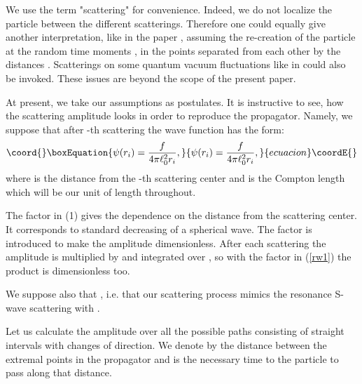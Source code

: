 \documentclass[a4paper,12pt]{article}
\begin{document}
We use the term "scattering" for convenience. Indeed, we do not localize the
particle between the different scatterings. Therefore one could equally give
another interpretation, like in the paper \cite{Kirilyuk00}, assuming the
re-creation of the  particle at the random time moments \coordHE{}, in  the points
separated from each other by the distances \coordHE{}. Scatterings on
some quantum
vacuum fluctuations like in \cite{Nelson84} could also be invoked.
These issues are beyond  the scope of the present paper.


At present, we take our assumptions as postulates. It is instructive
to see, how the scattering
amplitude looks  in order to reproduce the propagator. Namely, we suppose
that after \coordHE{}-th scattering the wave function has the form:
\begin{equation}\coord{}\boxEquation{\label{rw1}
\psi(r_i)=\frac{f}{4\pi \ell_0^2 r_{i}},
}{\psi(r_i)=\frac{f}{4\pi \ell_0^2 r_{i}},
}{ecuacion}\coordE{}\end{equation}
where \coordHE{} is the distance from the \coordHE{}-th scattering center
and \coordHE{} is the Compton length which will be our unit of length
throughout.

The factor \coordHE{} in (1) gives the dependence on the
distance from the scattering center. It corresponds to standard
decreasing of a spherical wave. The factor \coordHE{} is
introduced to make the amplitude \coordHE{} dimensionless.
After each scattering the amplitude is  multiplied by \coordHE{}
and integrated over \coordHE{}, so with the factor \coordHE{} in
(\ref{rw1}) the product \coordHE{} is dimensionless too.

We suppose also that \coordHE{}, i.e. that our scattering process
mimics the resonance S-wave scattering with \coordHE{}.

Let us calculate  the amplitude \coordHE{} over all the possible
paths consisting of straight intervals with \coordHE{} changes of
direction. We denote by \coordHE{} the distance between the
extremal points in the propagator and \coordHE{} is the necessary time to
the particle to pass along that distance.
\end{document}
